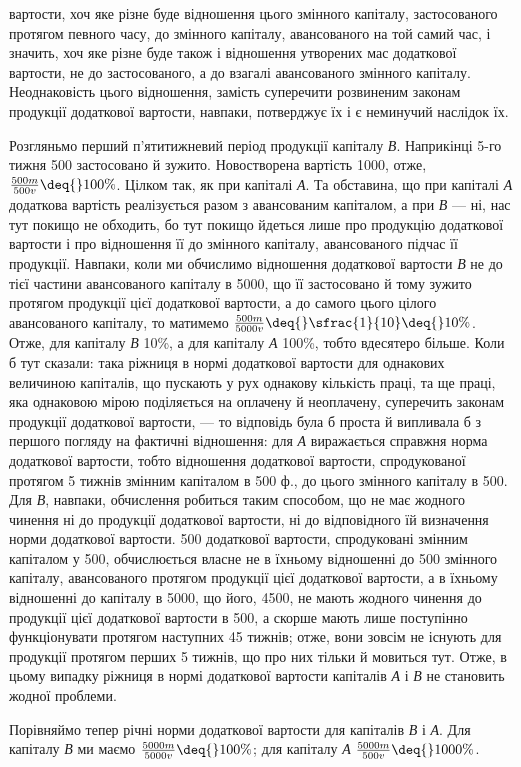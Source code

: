 \parcont{}  %
вартости, хоч яке різне буде відношення цього змінного капіталу, застосованого
протягом певного часу, до змінного капіталу, авансованого на
той самий час, і значить, хоч яке різне буде також і відношення утворених
мас додаткової вартости, не до застосованого, а до взагалі авансованого
змінного капіталу. Неоднаковість цього відношення, замість суперечити
розвиненим законам продукції додаткової вартости, навпаки,
потверджує їх і є неминучий наслідок їх.

\enlargethispage{\baselineskip}
Розгляньмо перший п’ятитижневий період продукції капіталу \emph{В}. Наприкінці
5-го тижня 500 застосовано й зужито. Новостворена
вартість \deq{} 1000, отже, $\frac{500m}{500v} \deq{} 100\%$. Цілком так, як при капіталі \emph{А}.
Та обставина, що при капіталі \emph{А} додаткова вартість реалізується разом з
авансованим капіталом, а при \emph{В} — ні, нас тут покищо не обходить, бо
тут покищо йдеться лише про продукцію додаткової вартости і про
відношення її до змінного капіталу, авансованого підчас її продукції.
Навпаки, коли ми обчислимо відношення додаткової вартости \emph{В} не
до тієї частини авансованого капіталу в 5000, що її застосовано й
тому зужито протягом продукції цієї додаткової вартости, а до самого
цього цілого авансованого капіталу, то матимемо $\frac{500m}{5000v} \deq{} \sfrac{1}{10} \deq{} 10\%$.
Отже, для капіталу \emph{В} 10\%, а для капіталу \emph{А} 100\%, тобто вдесятеро
більше. Коли б тут сказали: така ріжниця в нормі додаткової вартости
для однакових величиною капіталів, що пускають у рух однакову кількість
праці, та ще праці, яка однаковою мірою поділяється на оплачену й
неоплачену, суперечить законам продукції додаткової вартости, — то
відповідь була б проста й випливала б з першого погляду на фактичні
відношення: для \emph{А} виражається справжня норма додаткової вартости,
тобто відношення додаткової вартости, спродукованої протягом 5 тижнів
змінним капіталом в 500 ф., до цього змінного капіталу в 500.
Для \emph{В}, навпаки, обчислення робиться таким способом, що не має жодного
чинення ні до продукції додаткової вартости, ні до відповідного їй
визначення норми додаткової вартости. 500 додаткової вартости,
спродуковані змінним капіталом у 500, обчислюється
власне не в їхньому відношенні до 500 змінного капіталу, авансованого
протягом продукції цієї додаткової вартости, а в їхньому відношенні
до капіталу в 5000, що  його, 4500, не мають
жодного чинення до продукції цієї додаткової вартости в 500, а
скорше мають лише поступінно функціонувати протягом наступних 45 тижнів;
отже, вони зовсім не існують для продукції протягом перших 5 тижнів,
що про них тільки й мовиться тут. Отже, в цьому випадку ріжниця
в нормі додаткової вартости капіталів \emph{А} і \emph{В} не становить жодної
проблеми.

Порівняймо тепер річні норми додаткової вартости для капіталів \emph{В} і \emph{А}.
Для капіталу \emph{В} ми маємо $\frac{5000m}{5000v} \deq{} 100\%$;
для капіталу \emph{А} $\frac{5000m}{500v} \deq{} 1000\%$.
\parbreak{}  %
